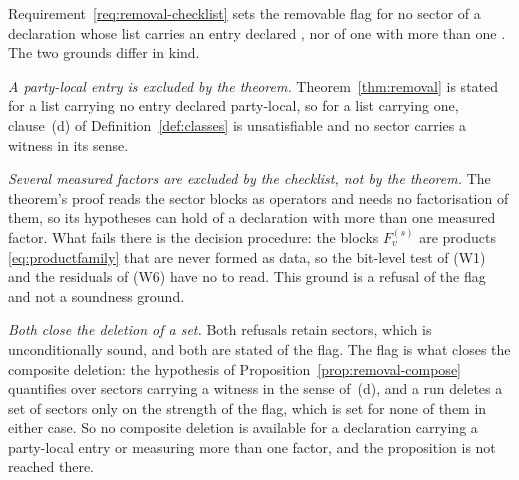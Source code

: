 
Requirement~\ref{req:removal-checklist} sets the removable flag for no
sector of a declaration whose list carries an entry declared
, nor of one with more than one .
The two grounds differ in kind.

\begin{remark}\label{rem:removal-general-format}
\emph{A party-local entry is excluded by the theorem.}
Theorem~\ref{thm:removal} is stated for a list carrying no entry declared
party-local, so for a list carrying one, clause~(d) of
Definition~\ref{def:classes} is unsatisfiable and no sector carries a
witness in its sense.

\emph{Several measured factors are excluded by the checklist, not by the
theorem.} The theorem's proof reads the sector blocks as operators and
needs no factorisation of them, so its hypotheses can hold of a declaration
with more than one measured factor. What fails there is the decision
procedure: the blocks $F^{(s)}_v$ are products \eqref{eq:productfamily}
that are never formed as data, so the bit-level test of (W1) and the
residuals of (W6) have no  to read. This ground is a
refusal of the flag and not a soundness ground.

\emph{Both close the deletion of a set.} Both refusals retain sectors,
which is unconditionally sound, and both are stated of the flag. The flag is
what closes the composite deletion: the hypothesis of
Proposition~\ref{prop:removal-compose} quantifies over sectors carrying a
witness in the sense of~(d), and a run deletes a set of sectors only on the
strength of the flag, which is set for none of them in either case. So no
composite deletion is available for a declaration carrying a party-local
entry or measuring more than one factor, and the proposition is not reached
there.
\end{remark}
